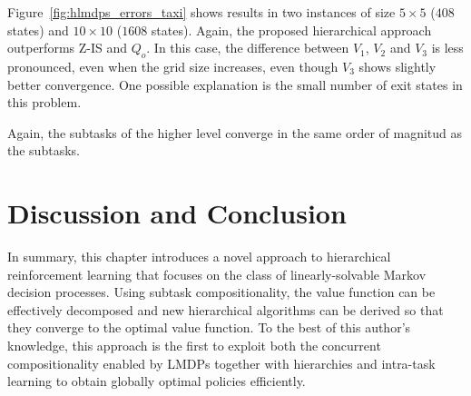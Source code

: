 Figure~\ref{fig:hlmdps_errors_taxi} shows results in two instances of size $5 \times 5$ ($408$ states) and $10 \times 10$ ($1608$ states). %
Again, the proposed hierarchical approach outperforms Z-IS and $Q_o$.
In this case, the difference between $V_1$, $V_2$ and $V_3$ is less pronounced, even when the grid size increases, even though $V_3$ shows slightly better convergence. One possible explanation is the small number of exit states in this problem.

Again, the subtasks of the higher level converge in the same order of magnitud as the subtasks.



\section{Discussion and Conclusion}

In summary, this chapter introduces a novel approach to hierarchical reinforcement learning that focuses on the class of linearly-solvable Markov decision processes.
Using subtask compositionality, the value function can be effectively decomposed and new hierarchical algorithms can be derived so that they converge to the optimal value function.
To the best of this author's knowledge, this approach is the first to exploit both the concurrent compositionality enabled by LMDPs together with hierarchies and intra-task learning to obtain globally optimal policies efficiently.

